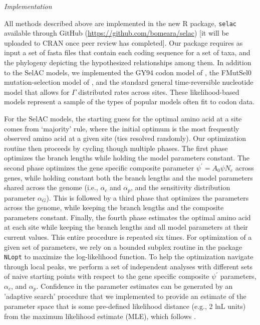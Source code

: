 \documentclass[12pt,letterpaper]{article}
\renewcommand{\subsection}[1]{%
\bigskip
\begin{center}
\begin{large}
\normalfont\itshape #1
\end{large}
\end{center}}
\newcommand{\Ne}{\ensuremath{{N_e}}\xspace} %
\newcommand{\selac}{SelAC\xspace}
\newcommand{\alphac}{\ensuremath{\alpha_c}\xspace}
\newcommand{\alphag}{\ensuremath{\alpha_G}\xspace}
\newcommand{\alphap}{\ensuremath{\alpha_p}\xspace}
\newcommand{\psiprime}{\ensuremath{\psi^\prime}\xspace}
\begin{document}
\subsection{Implementation}
All methods described above are implemented in the new R package, \texttt{selac} available through GitHub (\url{https://github.com/bomeara/selac}) [it will be uploaded to CRAN once peer review has completed].
Our package requires as input a set of fasta files that contain each coding sequence for a set of taxa, and the phylogeny depicting the hypothesized relationships among them.
In addition to the SelAC models, we implemented the GY94 codon model of \citet{GoldmanAndYang1994}, the FMutSel0 mutation-selection model of \citet{YangAndNielsen2008}, and the standard general time-reversible nucleotide model that allows for $\Gamma$ distributed rates across sites.
These likelihood-based models represent a sample of the types of popular models often fit to codon data.

For the \selac models, the starting guess for the optimal amino acid at a site comes from `majority' rule, where the initial optimum is the most frequently observed amino acid at a given site (ties resolved randomly).
Our optimization routine then proceeds by cycling though multiple phases.
The first phase optimizes the branch lengths while holding the model parameters constant.
The second phase optimizes the gene specific composite parameter $ \psiprime = A_0 \psi \Ne$ across genes, while holding constant both the branch lengths and the model parameters shared across the genome (i.e., $\alphac$ and $\alphap$, and the sensitivity distribution parameter $\alphag$).
This is followed by a third phase that optimizes the parameters across the genome, while keeping the branch lengths and the composite parameters constant.
Finally, the fourth phase estimates the optimal amino acid at each site while keeping the branch lengths and all model parameters at their current values.
This entire procedure is repeated six times.
For optimization of a given set of parameters, we rely on a bounded subplex routine \citep{Rowan1990} in the package \texttt{NLopt} \citep{Johnson2012} to maximize the log-likelihood function.
To help the optimization navigate through local peaks, we perform a set of independent analyses with different sets of naive starting points with respect to the gene specific composite $\psiprime$ parameters, $\alphac$, and $\alphap$.
Confidence in the parameter estimates can be generated by an 'adaptive search' procedure that we implemented to provide an estimate of the parameter space that is some pre-defined likelihood distance (e.g., 2 lnL units) from the maximum likelihood estimate (MLE), which follows  \citet{BeaulieuAndOMeara2016,edwards1984likelihood}.
\end{document}
